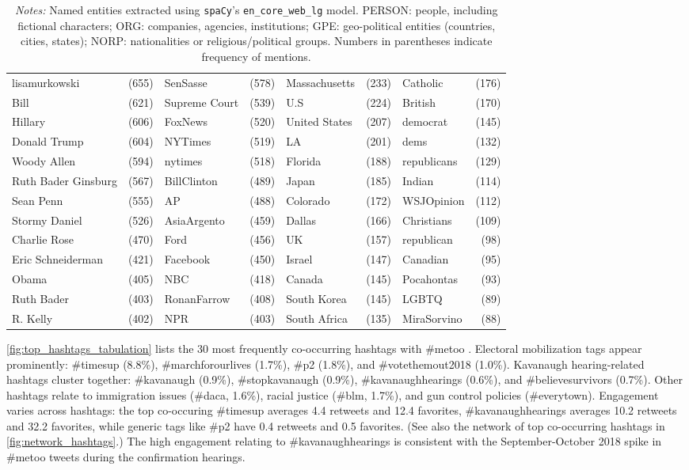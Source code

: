 \documentclass[manuscript,screen,nonacm,11pt,acm]{acmart}
\begin{document}
\begin{bibunit}
\begin{table}
\begin{adjustbox}{max width=\textwidth}
\begin{tabular}{@{}lr|lr|lr|lr@{}}
			lisamurkowski & (655) & SenSasse & (578) & Massachusetts & (233) & Catholic & (176) \\
			Bill & (621) & Supreme Court & (539) & U.S & (224) & British & (170) \\
			Hillary & (606) & FoxNews & (520) & United States & (207) & democrat & (145) \\
			Donald Trump & (604) & NYTimes & (519) & LA & (201) & dems & (132) \\
			Woody Allen & (594) & nytimes & (518) & Florida & (188) & republicans & (129) \\
			Ruth Bader Ginsburg & (567) & BillClinton & (489) & Japan & (185) & Indian & (114) \\
			Sean Penn & (555) & AP & (488) & Colorado & (172) & WSJOpinion & (112) \\
			Stormy Daniel & (526) & AsiaArgento & (459) & Dallas & (166) & Christians & (109) \\
			Charlie Rose & (470) & Ford & (456) & UK & (157) & republican & (98) \\
			Eric Schneiderman & (421) & Facebook & (450) & Israel & (147) & Canadian & (95) \\
			Obama & (405) & NBC & (418) & Canada & (145) & Pocahontas & (93) \\
			Ruth Bader & (403) & RonanFarrow & (408) & South Korea & (145) & LGBTQ & (89) \\
			R. Kelly & (402) & NPR & (403) & South Africa & (135) & MiraSorvino & (88) \\
			\bottomrule
		\end{tabular}
	\end{adjustbox}
	\caption*{
		\footnotesize
		\textit{Notes:} Named entities extracted using \texttt{spaCy}'s \texttt{en\_core\_web\_lg} model. PERSON: people, including fictional characters; ORG: companies, agencies, institutions; GPE: geo-political entities (countries, cities, states); NORP: nationalities or religious/political groups. Numbers in parentheses indicate frequency of mentions.
	}
\end{table}

\cref{fig:top_hashtags_tabulation} lists the 30 most frequently co-occurring hashtags with \#metoo \citep{forestplot}.
Electoral mobilization tags appear prominently: \#timesup (8.8\%), \#marchforourlives (1.7\%), \#p2 (1.8\%), and \#votethemout2018 (1.0\%).
Kavanaugh hearing-related hashtags cluster together: \#kavanaugh (0.9\%), \#stopkavanaugh (0.9\%), \#kavanaughhearings (0.6\%), and \#believesurvivors (0.7\%).
Other hashtags relate to immigration issues (\#daca, 1.6\%), racial justice (\#blm, 1.7\%), and gun control policies (\#everytown).
Engagement varies across hashtags: the top co-occuring \#timesup averages 4.4 retweets and 12.4 favorites, \#kavanaughhearings averages 10.2 retweets and 32.2 favorites, while generic tags like \#p2 have 0.4 retweets and 0.5 favorites.
(See also the network of top co-occurring hashtags in \cref{fig:network_hashtags}.)
The high engagement relating to \#kavanaughhearings is consistent with the September-October 2018 spike in \#metoo tweets during the confirmation hearings.


\end{bibunit}
\end{document}
